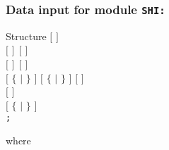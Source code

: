 \subsubsection{Data input for module {\tt SHI:}}\label{sect:descshi}

\begin{DataStructure}{Structure }
$[$   $]$ \\
$[$    $]~~[$    $]$ \\
$[$   $]~~[$    $]$  \\
$[$ $\{$  $|$  $\}$ $]$ $[$ $\{$  $|$  $\}$
$]$ $[$  $]$ \\
$[$   $]$ \\
$[$ $\{$  $|$  $\}$ $]$ \\
{\tt ;}
\end{DataStructure}

\noindent 
where

